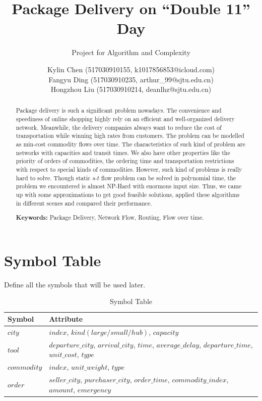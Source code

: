 \documentclass{llncs}
\title{Package Delivery on ``Double 11'' Day}
\subtitle{Project for Algorithm and Complexity \vspace{-3mm}}
\author{
Kylin Chen (517030910155, k1017856853@icloud.com) \\
Fangyu Ding (517030910235, arthur\_99@sjtu.edu.cn) \\
Hongzhou Liu (517030910214, deanlhz@sjtu.edu.cn)
  }
\institute{Department of Computer Science, \\ Shanghai Jiao Tong University, Shanghai, China}
\begin{document}



\maketitle
\begin{abstract}\vspace{-5mm}
Package delivery is such a significant problem nowadays. The convenience and speediness of online shopping highly rely on an efficient and well-organized delivery network.
Meanwhile, the delivery companies always want to reduce the cost of transportation while winning high rates from customers. The problem can be modelled as min-cost commodity flows over time.
The characteristics of such kind of problem are networks with capacities and transit times. We also have other properties like the priority of orders of commodities, the ordering time and transportation restrictions 
with respect to special kinds of commodities. However, such kind of problems is really hard to solve. Though static $s$-$t$ flow problem can be solved in polynomial time, the problem we encountered is almost NP-Hard with enormous input size.
Thus, we came up with some approximations to get good feasible solutions, applied these algorithms in different scenes and compared their performance.

\textbf{Keywords:} Package Delivery, Network Flow, Routing, Flow over time.
\end{abstract}

\setcounter{section}{-1}
\section{Symbol Table}
Define all the symbols that will be used later.
\begin{table}
\caption{Symbol Table}\label{sym1}
\centering
\begin{tabular}{|l|l|}
\hline
Symbol &  Attribute \\
\hline
$city$ & $index$, $kind(large/small/hub)$, $capacity$\\
\hline
$tool$ & $departure\_city$, $arrival\_city$, $time$, $average\_delay$, $departure\_time$, $unit\_cost$, $type$ \\
\hline
$commodity$ & $index$, $unit\_weight$, $type$ \\
\hline
$order$ & $seller\_city$, $purchaser\_city$, $order\_time$, $commodity\_index$, $amount$, $emergency$ \\
\hline
\end{tabular}
\end{table}
\end{document}
